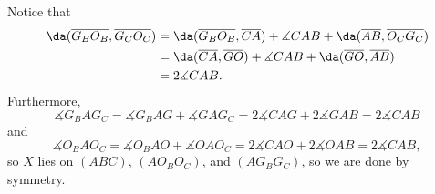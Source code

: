 Notice that
\begin{align*}
    \da(\overline{G_BO_B},\overline{G_CO_C})&=\da(\overline{G_BO_B},\overline{CA})+\measuredangle CAB+\da(\overline{AB},\overline{O_CG_C})\\
    &=\da(\overline{CA},\overline{GO})+\measuredangle CAB+\da(\overline{GO},\overline{AB})\\
    &=2\measuredangle CAB.
\end{align*}
Furthermore, \[\measuredangle G_BAG_C=\measuredangle G_BAG+\measuredangle GAG_C=2\measuredangle CAG+2\measuredangle GAB=2\measuredangle CAB\]
and \[\measuredangle O_BAO_C=\measuredangle O_BAO+\measuredangle OAO_C=2\measuredangle CAO+2\measuredangle OAB=2\measuredangle CAB,\]
so $X$ lies on $(ABC)$, $(AO_BO_C)$, and $(AG_BG_C)$, so we are done by symmetry. 

